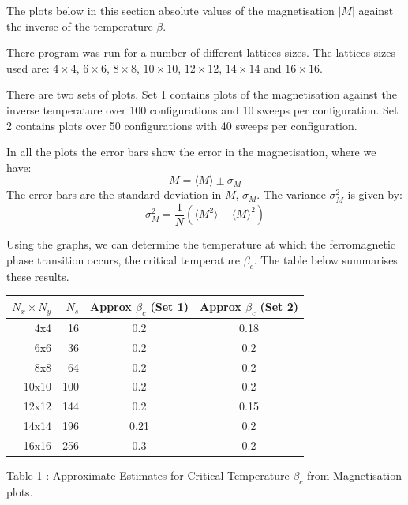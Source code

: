 \documentclass[a4paper]{IEEEtran}
\newcommand{\av}[1]{\langle #1 \rangle}
\begin{document}
    The plots below in this section absolute values of the 
    magnetisation $|M|$ against the inverse of the
    temperature $\beta$.

    There program was run for a number of different lattices sizes.
    The lattices sizes used are: $4 \times 4$, 
    $6 \times 6$, $8 \times 8$, $10 \times 10$, $12 \times 12$,
    $14 \times 14$ and $16 \times 16$.

    There are two sets of plots. Set 1 contains plots of the magnetisation
    against the inverse temperature over 100 configurations
    and 10 sweeps per configuration. Set 2 contains plots over 50
    configurations with 40 sweeps per configuration.

    In all the plots the error bars show the error in the magnetisation,
    where we have:
    \[ M = \av{M} \pm \sigma_M \]
    The error bars are the standard deviation in $M$, $\sigma_M$. 
    The variance $\sigma_{M}^2$ is given by:
    \[ \sigma_{M}^2 = \frac{1}{N} \left( \av{M^2} - \av{M}^2 \right) \]

    Using the graphs, we can determine the temperature at which
    the ferromagnetic phase transition occurs, the critical temperature $\beta_c$.
    The table below summarises these results.

    \begin{center}
        \begin{tabular}{|r|r|c|c|} \hline
        $N_x \times N_y$ & $N_s$ & Approx $\beta_c$ (Set 1)
                                 & Approx $\beta_c$ (Set 2) \\ \hline
        4x4   & 16  & 0.2 & 0.18 \\ \hline
        6x6   & 36  & 0.2 & 0.2  \\ \hline
        8x8   & 64  & 0.2 & 0.2  \\ \hline
        10x10 & 100 & 0.2 & 0.2  \\ \hline
        12x12 & 144 & 0.2 & 0.15 \\ \hline
        14x14 & 196 & 0.21 & 0.2 \\ \hline
        16x16 & 256 & 0.3 & 0.2  \\ \hline
        \end{tabular}
        \vspace{1mm}
        \begin{center}
            Table 1 : Approximate Estimates for Critical Temperature
                      $\beta_c$ from Magnetisation plots.
        \end{center}
    \end{center} 
\end{document}
